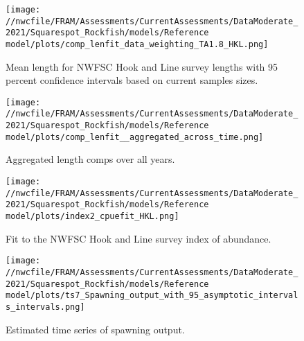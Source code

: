 \documentclass[11pt,
  english,
  a4paper,
]{article}
\begin{document}
\tagmcend\tagstructend


\begin{figure}
\centering
\texttt{[image: //nwcfile/FRAM/Assessments/CurrentAssessments/DataModerate\_2021/Squarespot\_Rockfish/models/Reference model/plots/comp\_lenfit\_data\_weighting\_TA1.8\_HKL.png]}
\caption{Mean length for NWFSC Hook and Line survey lengths with 95 percent confidence intervals based on current samples sizes.\label{fig:hkl-mean-len-fit}}
\end{figure}

\tagmcend\tagstructend


\begin{figure}
\centering
\texttt{[image: //nwcfile/FRAM/Assessments/CurrentAssessments/DataModerate\_2021/Squarespot\_Rockfish/models/Reference model/plots/comp\_lenfit\_\_aggregated\_across\_time.png]}
\caption{Aggregated length comps over all years.\label{fig:agg-len-fit}}
\end{figure}

\tagmcend\tagstructend


\begin{figure}
\centering
\texttt{[image: //nwcfile/FRAM/Assessments/CurrentAssessments/DataModerate\_2021/Squarespot\_Rockfish/models/Reference model/plots/index2\_cpuefit\_HKL.png]}
\caption{Fit to the NWFSC Hook and Line survey index of abundance.\label{fig:hkl-index-fit}}
\end{figure}

\tagmcend\tagstructend


\begin{figure}
\centering
\texttt{[image: //nwcfile/FRAM/Assessments/CurrentAssessments/DataModerate\_2021/Squarespot\_Rockfish/models/Reference model/plots/ts7\_Spawning\_output\_with\_95\_asymptotic\_intervals\_intervals.png]}
\caption{Estimated time series of spawning output.\label{fig:ssb}}
\end{figure}
\end{document}
